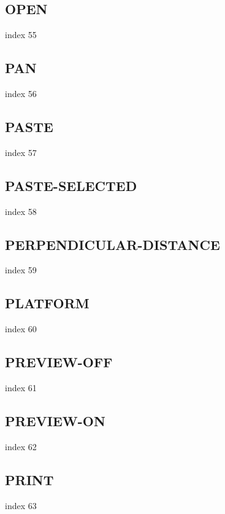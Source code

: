 \documentclass[a4paper]{report}
\begin{document}
\subsection{OPEN}

index 55

\subsection{PAN}

index 56

\subsection{PASTE}

index 57

\subsection{PASTE-SELECTED}

index 58

\subsection{PERPENDICULAR-DISTANCE}

index 59

\subsection{PLATFORM}

index 60

\subsection{PREVIEW-OFF}

index 61

\subsection{PREVIEW-ON}

index 62

\subsection{PRINT}

index 63
\end{document}

